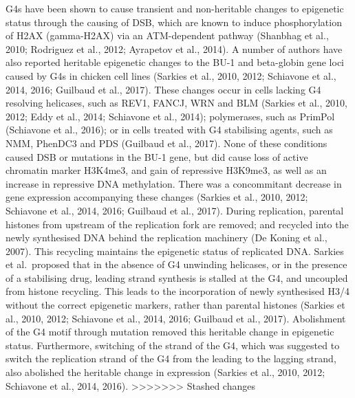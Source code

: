 \documentclass[12pt,a4paper,]{report}
\begin{document}
G4s have been shown to cause transient and non-heritable changes to
epigenetic status through the causing of DSB, which are known to induce
phosphorylation of H2AX (gamma-H2AX) via an ATM-dependent pathway
(Shanbhag et al., 2010; Rodriguez et al., 2012; Ayrapetov et al., 2014).
A number of authors have also reported heritable epigenetic changes to
the BU-1 and beta-globin gene loci caused by G4s in chicken cell lines
(Sarkies et al., 2010, 2012; Schiavone et al., 2014, 2016; Guilbaud et
al., 2017). These changes occur in cells lacking G4 resolving helicases,
such as REV1, FANCJ, WRN and BLM (Sarkies et al., 2010, 2012; Eddy et
al., 2014; Schiavone et al., 2014); polymerases, such as PrimPol
(Schiavone et al., 2016); or in cells treated with G4 stabilising
agents, such as NMM, PhenDC3 and PDS (Guilbaud et al., 2017). None of
these conditions caused DSB or mutations in the BU-1 gene, but did cause
loss of active chromatin marker H3K4me3, and gain of repressive H3K9me3,
as well as an increase in repressive DNA methylation. There was a
concommitant decrease in gene expression accompanying these changes
(Sarkies et al., 2010, 2012; Schiavone et al., 2014, 2016; Guilbaud et
al., 2017). During replication, parental histones from upstream of the
replication fork are removed; and recycled into the newly synthesised
DNA behind the replication machinery (De Koning et al., 2007). This
recycling maintains the epigenetic status of replicated DNA. Sarkies et
al.~proposed that in the absence of G4 unwinding helicases, or in the
presence of a stabilising drug, leading strand synthesis is stalled at
the G4, and uncoupled from histone recycling. This leads to the
incorporation of newly synthesised H3/4 without the correct epigenetic
markers, rather than parental histones (Sarkies et al., 2010, 2012;
Schiavone et al., 2014, 2016; Guilbaud et al., 2017). Abolishment of the
G4 motif through mutation removed this heritable change in epigenetic
status. Furthermore, switching of the strand of the G4, which was
suggested to switch the replication strand of the G4 from the leading to
the lagging strand, also abolished the heritable change in expression
(Sarkies et al., 2010, 2012; Schiavone et al., 2014, 2016).
\textgreater{}\textgreater{}\textgreater{}\textgreater{}\textgreater{}\textgreater{}\textgreater{}
Stashed changes
\end{document}
